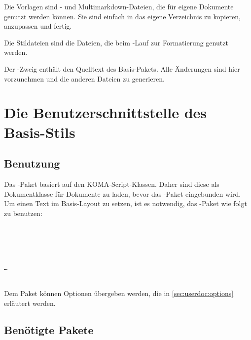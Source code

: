 
Die Vorlagen sind - und Multimarkdown-Dateien, die für eigene Dokumente genutzt werden können.
Sie sind einfach in das eigene Verzeichnis zu kopieren, anzupassen und fertig.


Die Stildateien sind die Dateien, die beim -Lauf zur Formatierung genutzt werden.


Der -Zweig enthält den Quelltext des Basis-Pakets.
Alle Änderungen sind hier vorzunehmen und die anderen Dateien zu generieren.



\section{Die Benutzerschnittstelle des Basis-Stils}

\subsection{Benutzung}

Das -Paket basiert auf den KOMA-Script-Klassen.
Daher sind diese als Dokumentklasse für Dokumente zu laden, bevor das -Paket eingebunden wird.
Um einen Text im Basis-Layout zu setzen, ist es notwendig, das -Paket wie folgt zu benutzen:

\begin{nutzung}
		\>\\
	\beispiel
		\>\\
		\>\\
		\>\\
		\>\texttt{\dots}\\
		\>\\
\end{nutzung}

Dem Paket können Optionen übergeben werden, die in \autoref{sec:userdoc:options} erläutert werden.

\subsection{Benötigte Pakete}
\label{sec:userdoc:packages}

